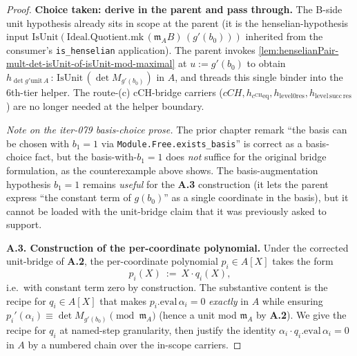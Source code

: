 \begin{proof}
\textbf{Choice taken: derive in the parent and pass through.}
The B-side unit hypothesis already sits in scope at the parent
(it is the henselian-hypothesis input
$\mathrm{IsUnit}(\mathrm{Ideal.Quotient.mk}\,(\mathfrak m_A B)\,
(g'(b_0)))$ inherited from the consumer's
\texttt{is\_henselian} application). The parent invokes
\cref{lem:henselianPair-mult-det-isUnit-of-isUnit-mod-maximal}
at $u := g'(b_0)$ to obtain
$h_{\det g'\mathrm{unit}\,A}\,:\,\mathrm{IsUnit}\,(\det
M_{g'(b_0)})$ in $A$, and threads this single binder into the
6th-tier helper. The route-(c) cCH-bridge carriers ($cCH,
h_{c^{\mathrm{CH}}\mathrm{eq}}, h_{\mathrm{level} 0\mathrm{res}},
h_{\mathrm{level\,succ\,res}}$) are no longer needed at the
helper boundary.

\textit{Note on the iter-079 basis-choice prose.} The prior
chapter remark ``the basis can be chosen with $b_1 = 1$ via
\texttt{Module.Free.exists\_basis}'' is correct as a basis-choice
fact, but the basis-with-$b_1 = 1$ does \emph{not} suffice for
the original bridge formulation, as the counterexample above
shows. The basis-augmentation hypothesis $b_1 = 1$ remains
\emph{useful} for the \textbf{A.3} construction (it lets the
parent express ``the constant term of $g(b_0)$'' as a single
coordinate in the basis), but it cannot be loaded with the
unit-bridge claim that it was previously asked to support.


\textbf{A.3. Construction of the per-coordinate polynomial.}
Under the corrected unit-bridge of \textbf{A.2}, the per-coordinate
polynomial $p_i \in A[X]$ takes the form
\[
p_i(X)\ :=\ X \cdot q_i(X),
\]
i.e.\ with constant term zero by construction. The substantive
content is the recipe for $q_i \in A[X]$ that makes
$p_i.\mathrm{eval}\,\alpha_i = 0$ \emph{exactly} in $A$ while
ensuring $p_i'(\alpha_i) \equiv \det M_{g'(b_0)} \pmod{\mathfrak m_A}$
(hence a unit mod $\mathfrak m_A$ by \textbf{A.2}). We give the
recipe for $q_i$ at named-step granularity, then justify the
identity $\alpha_i \cdot q_i.\mathrm{eval}\,\alpha_i = 0$ in $A$
by a numbered chain over the in-scope carriers.


\end{proof}
